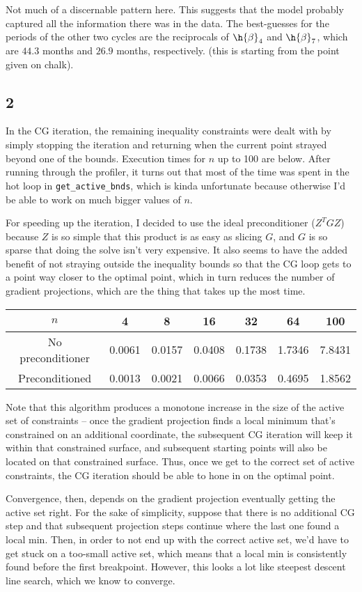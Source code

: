 \documentclass{article}
\begin{document}
Not much of a discernable pattern here. This suggests that the model probably captured all the information there was in the data. The best-guesses for the periods of the other two cycles are the reciprocals of $\h{\beta}_4$ and $\h{\beta}_7$, which are $44.3$ months and $26.9$ months, respectively. (this is starting from the point given on chalk).
\subsection*{2}
In the CG iteration, the remaining inequality constraints were dealt with by simply stopping the iteration and returning when the current point strayed beyond one of the bounds. Execution times for $n$ up to 100 are below. After running through the profiler, it turns out that most of the time was spent in the hot loop in \verb|get_active_bnds|, which is kinda unfortunate because otherwise I'd be able to work on much bigger values of $n$. 

For speeding up the iteration, I decided to use the ideal preconditioner ($Z^TGZ$) because $Z$ is so simple that this product is as easy as slicing $G$, and $G$ is so sparse that doing the solve isn't very expensive. It also seems to have the added benefit of not straying outside the inequality bounds so that the CG loop gets to a point way closer to the optimal point, which in turn reduces the number of gradient projections, which are the thing that takes up the most time.

\begin{tabular}{c|cccccc}
    $n$&4&8&16&32&64&100\\
    \hline
    No preconditioner&0.0061&0.0157&0.0408&0.1738&1.7346&7.8431\\
    \hline
    Preconditioned&0.0013&0.0021&0.0066&0.0353&0.4695&1.8562\\
\end{tabular}

Note that this algorithm produces a monotone increase in the size of the active set of constraints -- once the gradient projection finds a local minimum that's constrained on an additional coordinate, the subsequent CG iteration will keep it within that constrained surface, and subsequent starting points will also be located on that constrained surface. Thus, once we get to the correct set of active constraints, the CG iteration should be able to hone in on the optimal point. 

Convergence, then, depends on the gradient projection eventually getting the active set right. For the sake of simplicity, suppose that there is no additional CG step and that subsequent projection steps continue where the last one found a local min. Then, in order to not end up with the correct active set, we'd have to get stuck on a too-small active set, which means that a local min is consistently found before the first breakpoint. However, this looks a lot like steepest descent line search, which we know to converge.
\end{document}
